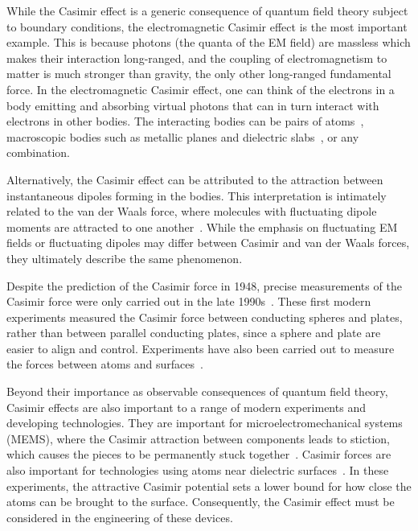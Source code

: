While the Casimir effect is a generic consequence of quantum field theory subject to boundary conditions,
the electromagnetic Casimir effect is the most important example.  
This is because photons (the quanta of the EM field) are massless which makes their interaction long-ranged, 
and the coupling of electromagnetism to matter is much stronger than gravity, the only other long-ranged fundamental force.  
In the electromagnetic Casimir effect, one can think of the electrons in a body emitting and absorbing virtual photons that can in turn
interact with electrons in other bodies. %
The interacting bodies can be pairs of atoms~\citep{CasimirPolder1948}, 
macroscopic bodies such as metallic planes and dielectric slabs~\citep{Lifshitz1956}, or any combination.

Alternatively, the Casimir effect can be attributed to the attraction between instantaneous dipoles forming in the bodies.  
This interpretation is intimately related to the van der Waals force, where 
molecules with fluctuating dipole moments are attracted to one another~\citep{vanderWaals}.
While the emphasis on fluctuating EM fields or fluctuating dipoles may differ between Casimir and van der Waals forces,
they ultimately describe the same phenomenon.%

Despite the prediction of the Casimir force in 1948, precise measurements of the Casimir force were only
carried out in the late 1990s~\citep{Lamoreaux1997,Mohideen1998}.  
These first modern experiments measured the Casimir force between conducting spheres and plates, 
rather than between parallel conducting plates, since a sphere and plate are easier to align and control. 
Experiments have also been carried out to measure the forces between atoms and surfaces~\citep{Sukenik1993,Perreault2005,Harber2005}.

Beyond their importance as observable consequences of quantum field theory, Casimir effects are also 
important to a range of modern experiments and developing technologies.
They are important for microelectromechanical systems (MEMS), where the Casimir attraction between components 
leads to stiction, which causes the pieces to be permanently stuck together~\citep{Buks2001}.  
Casimir forces are also important for technologies using atoms near dielectric surfaces~\citep{Folman2000,Alton2011, Hung2013}.
In these experiments, the attractive Casimir potential sets a lower bound for how
close the atoms can be brought to the surface.  Consequently, the Casimir effect must be considered in the engineering 
of these devices.

